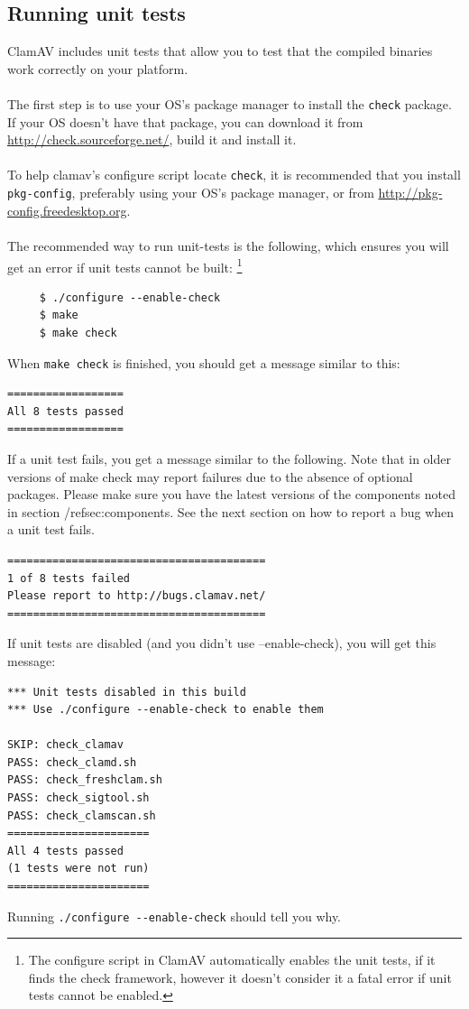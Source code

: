 \documentclass[a4paper,titlepage,12pt]{article}
\begin{document}
    \subsection{Running unit tests}\label{unit-testing}
	ClamAV includes unit tests that allow you to test that the compiled binaries work correctly on your platform.
        \\\\
	The first step is to use your OS's package manager to install the \verb+check+ package. 
	If your OS doesn't have that package, you can download it from \url{http://check.sourceforge.net/}, 
	build it and install it.
        \\\\
	To help clamav's configure script locate \verb+check+, it is recommended that you install \verb+pkg-config+, preferably
	using your OS's package manager, or from \url{http://pkg-config.freedesktop.org}.
        \\\\
	The recommended way to run unit-tests is the following, which ensures you will get an error if unit tests cannot be built:
	\footnote{The configure script in ClamAV automatically enables the unit tests, if it finds the check framework, however it doesn't consider it a fatal error if unit tests cannot be enabled.}
	\begin{verbatim}
	 $ ./configure --enable-check
	 $ make
	 $ make check
	\end{verbatim}
	When \verb+make check+ is finished, you should get a message similar to this:
	\begin{verbatim}
==================
All 8 tests passed
==================
	\end{verbatim}
	If a unit test fails, you get a message similar to the following.
        Note that in older versions of make check may report failures due to
        the absence of optional packages. Please make sure you have the
        latest versions of the components noted in section /ref{sec:components}.
	See the next section on how to report a bug when a unit test fails.
	\begin{verbatim}
========================================
1 of 8 tests failed
Please report to http://bugs.clamav.net/
========================================
	\end{verbatim}
	If unit tests are disabled (and you didn't use --enable-check), you will get this message:
	\begin{verbatim}
*** Unit tests disabled in this build
*** Use ./configure --enable-check to enable them

SKIP: check_clamav
PASS: check_clamd.sh
PASS: check_freshclam.sh
PASS: check_sigtool.sh
PASS: check_clamscan.sh
======================
All 4 tests passed
(1 tests were not run)
======================
	\end{verbatim}
	Running \verb+./configure --enable-check+ should tell you why.
\end{document}
